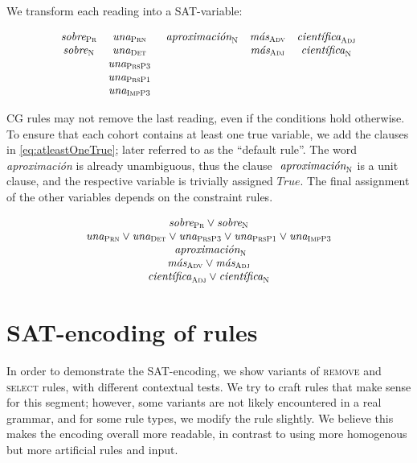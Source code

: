 \noindent We transform each reading into a SAT-variable:

\begin{equation}
\begin{array}{c c c c c}
\sobrePr & \unaPrn & \aproximacionN & \masAdv & \cientificaAdj \\
\sobreN  & \unaDet &                & \masAdj & \cientificaN \\
         & \unaPrsPThree \\
         & \unaPrsPOne \\
         & \unaImp \\
\end{array}
\end{equation}

CG rules may not remove the last reading, even if the conditions hold otherwise.
To ensure that each cohort contains at least one true variable, we add the clauses in \ref{eq:atleastOneTrue}; later referred to as the ``default rule''. 
The word \emph{aproximación} is already unambiguous, thus the clause $\text{ \em aproximaci\'{o}n}_{\text{\sc N}}$ is a unit clause, and the respective variable is trivially assigned $True$. 
The final assignment of the other variables depends on the constraint rules.


\begin{equation}
\begin{array}{c}
\sobrePr \vee \sobreN \\
\unaPrn \vee \unaDet \vee \unaPrsPThree \vee \unaPrsPOne \vee \unaImp \\
\aproximacionN \\
\masAdv \vee \masAdj \\
\cientificaAdj \vee \cientificaN \\
\end{array}
\label{eq:atleastOneTrue}
\end{equation}


\section{SAT-encoding of rules}

In order to demonstrate the SAT-encoding, we show variants of \textsc{remove} and \textsc{select} rules, with different contextual tests. 
We try to craft rules that make sense for this segment; however, some variants are not likely encountered in a real grammar, and for some rule types, we modify the rule slightly. We believe this makes the encoding overall more readable, in contrast to using more homogenous but more artificial rules and input.

